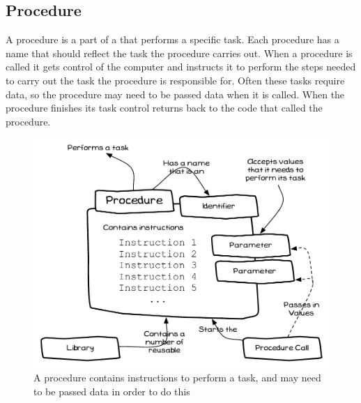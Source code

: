 \clearpage
\subsection{Procedure} %
\label{sub:procedure}

A procedure is a part of a  that performs a specific task. Each procedure has a name that should reflect the task the procedure carries out. When a procedure is called it gets control of the computer and instructs it to perform the steps needed to carry out the task the procedure is responsible for. Often these tasks require data, so the procedure may need to be passed data when it is called. When the procedure finishes its task control returns back to the code that called the procedure.

\begin{figure}[h]
   \centering
   \includegraphics[width=\textwidth]{./topics/program-creation/diagrams/Procedure} 
   \caption{A procedure contains instructions to perform a task, and may need to be passed data in order to do this}
   \label{fig:program-creation-procedure}
\end{figure}


